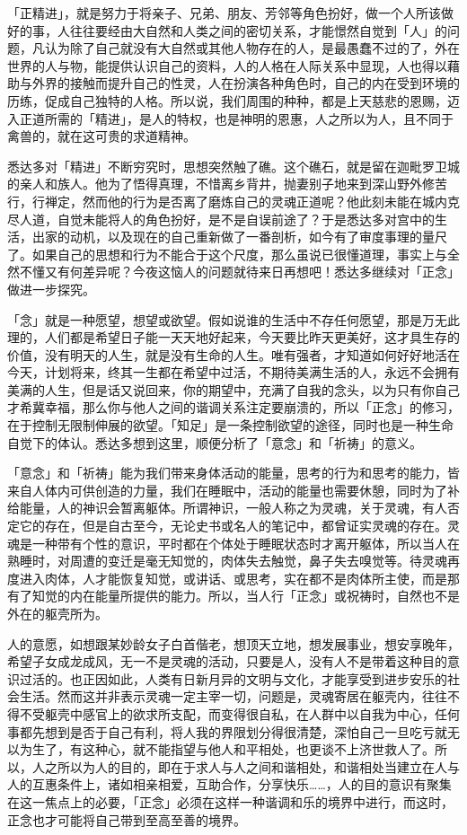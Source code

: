 \documentclass[twoside,openany]{book}
\begin{document}
「正精进」，就是努力于将亲子、兄弟、朋友、芳邻等角色扮好，做一个人所该做好的事，人往往要经由大自然和人类之间的密切关系，才能憬然自觉到「人」的问题，凡认为除了自己就没有大自然或其他人物存在的人，是最愚蠢不过的了，外在世界的人与物，能提供认识自己的资料，人的人格在人际关系中显现，人也得以藉助与外界的接触而提升自己的性灵，人在扮演各种角色时，自己的内在受到环境的历练，促成自己独特的人格。所以说，我们周围的种种，都是上天慈悲的恩赐，迈入正道所需的「精进」，是人的特权，也是神明的恩惠，人之所以为人，且不同于禽兽的，就在这可贵的求道精神。

悉达多对「精进」不断穷究时，思想突然触了礁。这个礁石，就是留在迦毗罗卫城的亲人和族人。他为了悟得真理，不惜离乡背井，抛妻别子地来到深山野外修苦行，行禅定，然而他的行为是否离了磨炼自己的灵魂正道呢？他此刻未能在城内克尽人道，自觉未能将人的角色扮好，是不是自误前途了？于是悉达多对宫中的生活，出家的动机，以及现在的自己重新做了一番剖析，如今有了审度事理的量尺了。如果自己的思想和行为不能合于这个尺度，那么虽说已很懂道理，事实上与全然不懂又有何差异呢？今夜这恼人的问题就待来日再想吧！悉达多继续对「正念」做进一步探究。

「念」就是一种愿望，想望或欲望。假如说谁的生活中不存任何愿望，那是万无此理的，人们都是希望日子能一天天地好起来，今天要比昨天更美好，这才具生存的价值，没有明天的人生，就是没有生命的人生。唯有强者，才知道如何好好地活在今天，计划将来，终其一生都在希望中过活，不期待美满生活的人，永远不会拥有美满的人生，但是话又说回来，你的期望中，充满了自我的念头，以为只有你自己才希冀幸福，那么你与他人之间的谐调关系注定要崩溃的，所以「正念」的修习，在于控制无限制伸展的欲望。「知足」是一条控制欲望的途径，同时也是一种生命自觉下的体认。悉达多想到这里，顺便分析了「意念」和「祈祷」的意义。

「意念」和「祈祷」能为我们带来身体活动的能量，思考的行为和思考的能力，皆来自人体内可供创造的力量，我们在睡眠中，活动的能量也需要休憩，同时为了补给能量，人的神识会暂离躯体。所谓神识，一般人称之为灵魂，关于灵魂，有人否定它的存在，但是自古至今，无论史书或名人的笔记中，都曾证实灵魂的存在。灵魂是一种带有个性的意识，平时都在个体处于睡眠状态时才离开躯体，所以当人在熟睡时，对周遭的变迁是毫无知觉的，肉体失去触觉，鼻子失去嗅觉等。待灵魂再度进入肉体，人才能恢复知觉，或讲话、或思考，实在都不是肉体所主使，而是那有了知觉的内在能量所提供的能力。所以，当人行「正念」或祝祷时，自然也不是外在的躯壳所为。

人的意愿，如想跟某妙龄女子白首偕老，想顶天立地，想发展事业，想安享晚年，希望子女成龙成风，无一不是灵魂的活动，只要是人，没有人不是带着这种目的意识过活的。也正因如此，人类有日新月异的文明与文化，才能享受到进步安乐的社会生活。然而这并非表示灵魂一定主宰一切，问题是，灵魂寄居在躯壳内，往往不得不受躯壳中感官上的欲求所支配，而变得很自私，在人群中以自我为中心，任何事都先想到是否于自己有利，将人我的界限划分得很清楚，深怕自己一旦吃亏就无以为生了，有这种心，就不能指望与他人和平相处，也更谈不上济世救人了。所以，人之所以为人的目的，即在于求人与人之间和谐相处，和谐相处当建立在人与人的互惠条件上，诸如相亲相爱，互助合作，分享快乐……，人的目的意识有聚集在这一焦点上的必要，「正念」必须在这样一种谐调和乐的境界中进行，而这时，正念也才可能将自己带到至高至善的境界。
\end{document}
